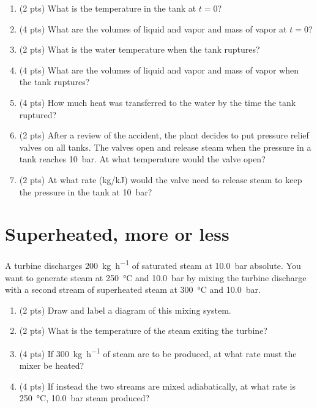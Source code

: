 \documentclass[11pt]{article}
\begin{document}
\begin{enumerate}
\item (2 pts) What is the temperature in the tank at \(t = 0\)?
\item (4 pts) What are the volumes of liquid and vapor and mass of vapor at \(t = 0\)?
\item (2 pts) What is the water temperature when the tank ruptures?
\item (4 pts) What are the volumes of liquid and vapor and mass of vapor when the tank ruptures?
\item (4 pts) How much heat was transferred to the water by the time the tank ruptured?
\item (2 pts) After a review of the accident, the plant decides to put pressure relief valves on all tanks.  The valves open and release steam when the pressure in a tank reaches \SI{10}{\bar}.  At what temperature would the valve open?
\item (2 pts) At what rate (kg/kJ) would the valve need to release steam to keep the pressure in the tank at \SI{10}{\bar}?
\end{enumerate}


\section{Superheated, more or less}
\label{sec-3}
A turbine discharges \SI{200}{\kilo\gram\per\hour} of saturated steam at \SI{10.0}{\bar} absolute.  You want to generate steam at \SI{250}{\celsius} and \SI{10.0}{\bar} by mixing the turbine discharge with a second stream of superheated steam at \SI{300}{\celsius} and \SI{10.0}{\bar}.
\begin{enumerate}
\item (2 pts) Draw and label a diagram of this mixing system.
\item (2 pts) What is the temperature of the steam exiting the turbine?
\item (4 pts) If \SI{300}{\kilo\gram\per\hour} of steam are to be produced, at what rate must the mixer be heated?
\item (4 pts) If instead the two streams are mixed adiabatically, at what rate is \SI{250}{\celsius}, \SI{10.0}{\bar} steam produced?
\end{enumerate}
\end{document}
